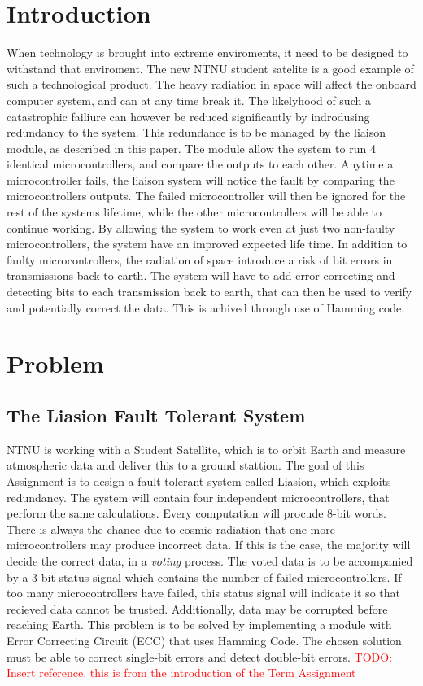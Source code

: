 \documentclass[a4paper]{IEEEtran}
\newcommand\TODO[1]{\textcolor{red}{TODO:#1}}
\newcommand\todo[1]{\TODO{#1}}
\begin{document}
\section{Introduction}
When technology is brought into extreme enviroments, it need to be designed to withstand that enviroment.
The new NTNU student satelite is a good example of such a technological product.
The heavy radiation in space will affect the onboard computer system, and can at any time break it.
The likelyhood of such a catastrophic failiure can however be reduced significantly by indrodusing redundancy to the system.
This redundance is to be managed by the liaison module, as described in this paper.
The module allow the system to run 4 identical microcontrollers, and compare the outputs to each other.
Anytime a microcontroller fails, the liaison system will notice the fault by comparing the microcontrollers outputs.
The failed microcontroller will then be ignored for the rest of the systems lifetime, while the other microcontrollers will be able to continue working.
By allowing the system to work even at just two non-faulty microcontrollers, the system have an improved expected life time.
In addition to faulty microcontrollers, the radiation of space introduce a risk of bit errors in transmissions back to earth.
The system will have to add error correcting and detecting bits to each transmission back to earth, that can then be used to verify and potentially correct the data.
This is achived through use of Hamming code.

\section{Problem}

\subsection{The Liasion Fault Tolerant System}
NTNU is working with a Student Satellite, which is to orbit Earth and measure atmospheric data and deliver this to a ground stattion.
The goal of this Assignment is to design a fault tolerant system called Liasion, which exploits redundancy.
The system will contain four independent microcontrollers, that perform the same calculations.
Every computation will procude 8-bit words.
There is always the chance due to cosmic radiation that one more microcontrollers may produce incorrect data.
If this is the case, the majority will decide the correct data, in a \textit{voting} process.
The voted data is to be accompanied by a 3-bit status signal which contains the number of failed microcontrollers.
If too many microcontrollers have failed, this status signal will indicate it so that recieved data cannot be trusted.
Additionally, data may be corrupted before reaching Earth.
This problem is to be solved by implementing a module with Error Correcting Circuit (ECC) that uses Hamming Code.
The chosen solution must be able to correct single-bit errors and detect double-bit errors.
\break 
\todo{ Insert reference, this is from the introduction of the Term Assignment}
\end{document}
